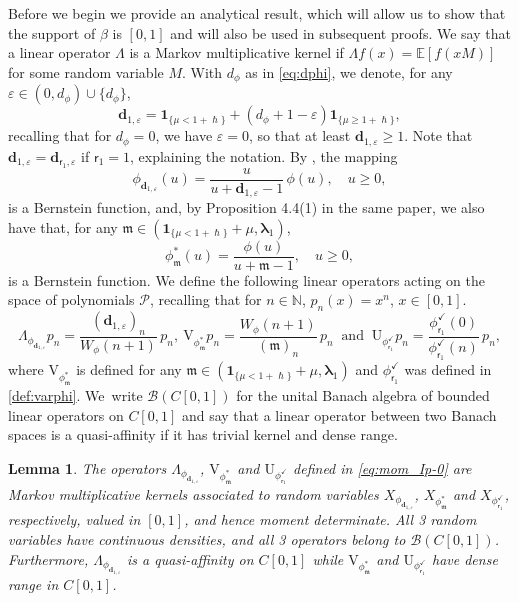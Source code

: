 \documentclass[10pt]{amsart}
\let\epsilon\varepsilon
\theoremstyle{plain}
\newtheorem{lemma}[theorem]{Lemma}
\theoremstyle{definition}
\newcommand{\E}{\mathbb{E}}
\newcommand{\N}{\mathbb{N}}
\newcommand{\Poly}{\mathscr{P}}
\newcommand{\m}{\mathfrak{m}}
\newcommand{\dpt}{\bm{d}_{\vat,\epsilon}}
\newcommand{\dph}{(d_\phi+1-\epsilon)}
\newcommand{\dz}{{\bm{d}}_{1,\epsilon}}
\newcommand{\Bo}[1]{\mathcal{B}(#1)}
\newcommand{\lam}{{\bm{\lambda}_1}}
\newcommand{\vat}{{\mathsf{r}_1}}
\newcommand{\phm}{{\phi_\m^*}}
\renewcommand{\varphi}{{\phi_{\vat}^{\checkmark}}}
\let\h\hslash
\let\mo\mu
\let\bpsi\beta
\begin{document}
Before we begin we provide an analytical result, which will allow us to show that the support of $\bpsi$ is $[0,1]$ and will also be used in subsequent proofs. We say that a linear operator $\Lambda$ is a Markov multiplicative kernel if $\Lambda f(x) = \E[f(xM)]$ for some random variable $M$. With $d_\phi$ as in \eqref{eq:dphi}, we denote, for any $\epsilon \in (0,d_\phi) \cup \{d_\phi\}$,
\begin{equation}
\label{eq:defn-d0}
\dz = \bm{1}_{\{ \mo < 1+\h \}} + \dph\bm{1}_{\{ \mo \geq 1+\h \}},
\end{equation}
recalling that for $d_\phi =0$, we have $\epsilon = 0$, so that at least $\dz \geq 1$. Note that $\dz=\dpt$ if $\vat=1$, explaining the notation. By \cite[Lem.\,10.3]{Patie-Savov-GeL}, the mapping
\begin{equation}
\label{eq:defphi-d0}
\phi_{\dz}(u)=\frac{u}{u+\dz-1}\,\phi(u), \quad u \ge 0,
\end{equation}
is a Bernstein function, and, by Proposition 4.4(1) in the same paper, we also have that, for
any $\m \in (\bm{1}_{\{\mo < 1+\h\}} + \mo, \lam)$,
\begin{equation}
\label{eq:def-phi-m}
\phm(u) = \frac{\phi(u)}{u+\m-1}, \quad u \ge 0,
\end{equation}
is a Bernstein function. We define the following linear operators acting on the space of polynomials $\Poly$, recalling
that for $n \in \N$, $p_n(x) = x^n$, $x \in [0,1]$.
\begin{equation}
\label{eq:mom_Ip-0}
\Lambda_{\phi_{\dz}}p_n = \frac{(\dz)_n}{W_\phi(n+1)}\,p_n, \:
\mathrm{V}_{\phm} p_n = \frac{W_{\phi}(n+1)}{(\m)_n}\,p_n \: \textrm{ and } \:
\mathrm{U}_\varphi p_n = \frac{\varphi(0)}{\varphi(n)}\,p_n,
\end{equation}
where $\mathrm{V}_{\phm}$ is defined for any $\m \in (\bm{1}_{\{\mo < 1+\h\}} + \mo, \lam)$ and $\varphi$ was defined in \eqref{def:varphi}. We~write $\Bo{C[0,1]}$ for the unital Banach algebra of bounded linear operators on $C[0,1]$ and say that a linear operator between two Banach spaces is a quasi-affinity if it has trivial kernel and dense range.

\begin{lemma}
\label{lem:Markov-kernel}
The operators $\Lambda_{\phi_{\dz}}$, $\mathrm{V}_{\phm}$ and $\mathrm{U}_{\varphi}$ defined in \eqref{eq:mom_Ip-0} are Markov multiplicative kernels associated to random variables $X_{\phi_{\dz}}$, $X_{\phm}$ and $X_{\varphi}$, respectively, valued in $[0,1]$, and hence moment determinate. All 3 random variables have continuous densities, and all 3 operators belong to $\Bo{C[0,1]}$. Furthermore, $\Lambda_{\phi_{\dz}}$ is a quasi-affinity on $C[0,1]$ while $\mathrm{V}_{\phm}$ and $\mathrm{U}_{\varphi}$ have dense range in $C[0,1]$.
\end{lemma}
\end{document}
